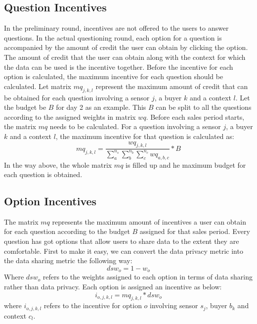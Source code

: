 

\subsection{Question Incentives}
In the preliminary round, incentives are not offered to the users to answer questions. In the actual questioning round, each option for a question is accompanied
by the amount of credit the user can obtain by clicking the option. The amount of credit that the user can obtain along with the context for which the data can be used is the incentive together.
Before the incentive for each option is calculated, the maximum incentive for each question should be calculated. Let matrix $mq_{j,k,l}$ represent the maximum amount of
credit that can be obtained for each question involving a sensor $j$, a buyer $k$ and a context $l$. Let the budget be $B$ for day 2 as an example. This $B$ can be split
to all the questions according to the assigned weights in matrix $wq$. Before each sales period starts, the matrix $mq$ needs to be calculated. For a question
involving a sensor $j$, a buyer $k$ and a context $l$, the maximum incentive for that question is calculated as:
$$mq_{j,k,l} = \frac{wq_{j,k,l}}{\sum^{n_s}_a \sum^{n_b}_b \sum^{n_c}_c wq_{a,b,c}}*B$$
In the way above, the whole matrix $mq$ is filled up and he maximum budget for each question is obtained.

\subsection{Option Incentives}
The matrix $mq$ represents the maximum amount of incentives a user can obtain for each question according to the budget $B$
assigned for that sales period. Every question has got options that allow users to share data to the extent they are comfortable.
First to make it easy, we can convert the data privacy metric into the data sharing metric the following way:
$$dsw_o = 1 - w_o$$
Where $dsw_o$ refers to the weights assigned to each option in terms of data sharing rather than data privacy. Each option is assigned an incentive as below:
$$i_{o,j,k,l} = mq_{j,k,l} * dsw_o$$
where $i_{o,j,k,l}$ refers to the incentive for option $o$ involving  sensor $s_j$, buyer $b_k$ and context $c_l$.

